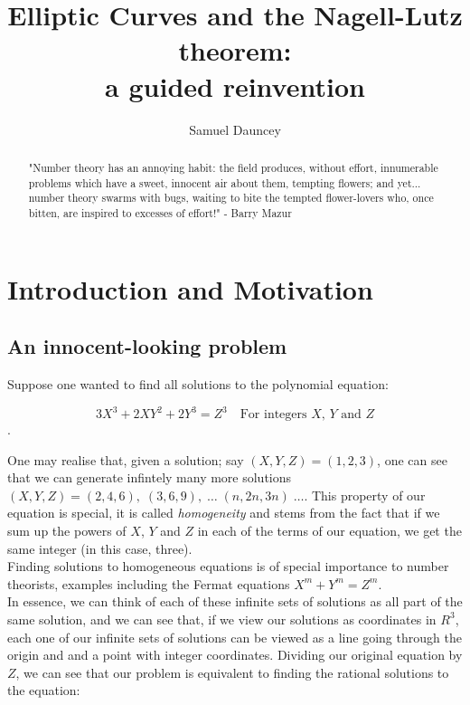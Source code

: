 \documentclass{article}
\title{Elliptic Curves and the Nagell-Lutz theorem:\\a guided reinvention}
\author{Samuel Dauncey}
\begin{document}
\maketitle

\begin{abstract}
    
"Number theory has an annoying habit: the field produces, without effort, innumerable problems which have a sweet, innocent air about them, tempting flowers; and yet... number theory swarms with bugs, waiting to bite the tempted flower-lovers who, once bitten, are inspired to excesses of effort!" - Barry Mazur
\end{abstract}

\section{Introduction and Motivation}

\subsection{An innocent-looking problem}

Suppose one wanted to find all solutions to the polynomial equation:

\[3 X^3 +  2 X Y^2 + 2 Y^3 = Z^3 \quad \text{For integers $X$, $Y$ and $Z$}\].

 One may realise that, given a solution; say $(X, Y, Z) = (1, 2, 3)$, one can see that we can generate infintely many more solutions $(X, Y, Z) = (2, 4, 6), \; (3, 6, 9), \; \dots \; (n, 2n, 3n) \; \dots $. This property of our equation is special, it is called \emph{homogeneity} and stems from the fact that if we sum up the powers of $X$, $Y$ and $Z$ in each of the terms of our equation, we get the same integer (in this case, three). \\
 
 Finding solutions to homogeneous equations is of special importance to number theorists, examples including the Fermat equations $X^m + Y^m = Z^m$. \\
 
 In essence, we can think of each of these infinite sets of solutions as all part of the same solution, and we can see that, if we view our solutions as coordinates in $R^3$, each one of our infinite sets of solutions can be viewed as a line going through the origin and and a point with integer coordinates. Dividing our original equation by $Z$, we can see that our problem is equivalent to finding the rational solutions to the equation:
 
\end{document}
